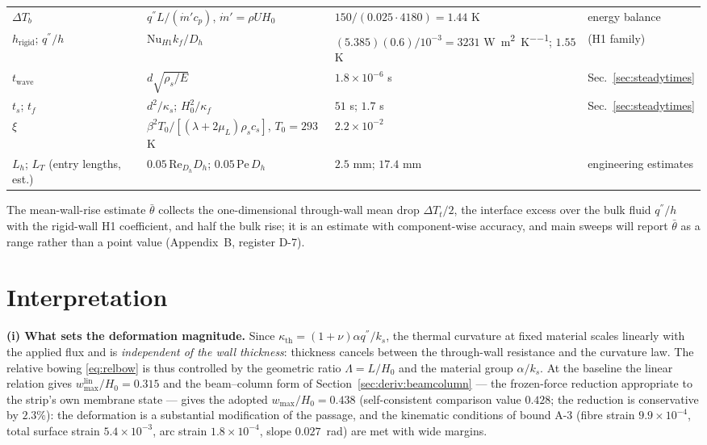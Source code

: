 \begin{longtable}{p{3.0cm}p{3.4cm}p{4.2cm}p{2.6cm}}
$\Delta T_b$ & $q^{''}L/(\dot m'c_p)$, $\dot m'=\rho UH_0$ & $150/(0.025\cdot4180)=1.44$ K & energy balance \\
$h_{\mathrm{rigid}}$; $q^{''}/h$ & $\mathrm{Nu}_{H1}k_f/D_h$ & $(5.385)(0.6)/10^{-3}=3231$ \si{\watt\per\square\metre\per\kelvin}; $1.55$ K & \cite{shah1978laminar} (H1 family) \\
$t_{\mathrm{wave}}$ & $d\sqrt{\rho_s/E}$ & $1.8\times10^{-6}$ s & Sec.~\ref{sec:steadytimes} \\
$t_s$; $t_f$ & $d^2/\kappa_s$; $H_0^2/\kappa_f$ & $51$ s; $1.7$ s & Sec.~\ref{sec:steadytimes} \\
$\xi$ & $\beta^2T_0/[(\lambda{+}2\mu_L)\rho_sc_s]$, $T_0=293$ K & $2.2\times10^{-2}$ & \cite{boley1960theory} \\
$L_h$; $L_T$ (entry lengths, est.) & $0.05\,\mathrm{Re}_{D_h}D_h$; $0.05\,\mathrm{Pe}\,D_h$ & $2.5$ mm; $17.4$ mm & engineering estimates \\
\bottomrule
\end{longtable}

The mean-wall-rise estimate $\bar\theta$ collects the one-dimensional through-wall mean drop
$\Delta T_t/2$, the interface excess over the bulk fluid $q^{''}/h$ with the rigid-wall H1
coefficient, and half the bulk rise; it is an estimate with component-wise accuracy, and main
sweeps will report $\bar\theta$ as a range rather than a point value (Appendix~B, register D-7).

\section{Interpretation}
\label{sec:interpretation}
\textbf{(i) What sets the deformation magnitude.} Since $\kappa_{\mathrm{th}}=(1+\nu)\alpha
q^{''}/k_s$, the thermal curvature at fixed material scales linearly with the applied flux and is
\emph{independent of the wall thickness}: thickness cancels between the through-wall resistance and
the curvature law. The relative bowing \eqref{eq:relbow} is thus controlled by the geometric ratio
$\Lambda=L/H_0$ and the material group $\alpha/k_s$. At the baseline the linear relation gives
$w_{\max}^{\mathrm{lin}}/H_0=0.315$ and the beam--column form of
Section~\ref{sec:deriv:beamcolumn} --- the frozen-force reduction appropriate to the strip's own
membrane state --- gives the adopted $w_{\max}/H_0=0.438$ (self-consistent comparison value
$0.428$; the reduction is conservative by $2.3\%$): the deformation is a substantial
modification of the passage, and the kinematic conditions of bound A-3 (fibre strain
$9.9\times10^{-4}$, total surface strain $5.4\times10^{-3}$, arc strain
$1.8\times10^{-4}$, slope $0.027$~rad) are met with wide margins.

